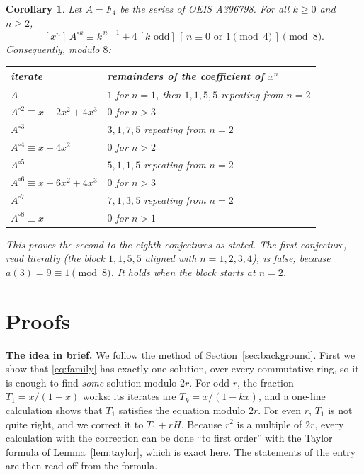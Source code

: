 \documentclass[11pt,a4paper]{article}
\newtheorem{corollary}[theorem]{Corollary}
\theoremstyle{definition}
\theoremstyle{remark}
\newcommand{\coeff}[2]{[x^{#1}]\,#2}
\newcommand{\para}[1]{\par\medskip\noindent\textbf{#1}\enspace}
\begin{document}
\begin{corollary}\label{cor:app}
Let $A=F_4$ be the series of OEIS A396798. For all $k\ge0$ and $n\ge2$,
\[
\coeff{n}{A^{\circ k}}\equiv k^{\,n-1}+4\,[k\text{ odd}]\,[\,n\equiv0\text{ or }1\!\!\pmod4\,]\pmod8 .
\]
Consequently, modulo $8$:
\begin{center}\small\upshape\renewcommand{\arraystretch}{1.15}
\begin{tabular}{ll}
\toprule
iterate & remainders of the coefficient of $x^n$\\
\midrule
$A$ & $1$ for $n=1$, then $1,1,5,5$ repeating from $n=2$\\
$A^{\circ2}\equiv x+2x^2+4x^3$ & $0$ for $n>3$\\
$A^{\circ3}$ & $3,1,7,5$ repeating from $n=2$\\
$A^{\circ4}\equiv x+4x^2$ & $0$ for $n>2$\\
$A^{\circ5}$ & $5,1,1,5$ repeating from $n=2$\\
$A^{\circ6}\equiv x+6x^2+4x^3$ & $0$ for $n>3$\\
$A^{\circ7}$ & $7,1,3,5$ repeating from $n=2$\\
$A^{\circ8}\equiv x$ & $0$ for $n>1$\\
\bottomrule
\end{tabular}
\end{center}
This proves the second to the eighth conjectures as stated. The first conjecture, read literally (the block
$1,1,5,5$ aligned with $n=1,2,3,4$), is false, because $a(3)=9\equiv1\pmod8$. It holds when the block starts at $n=2$.
\end{corollary}

\section{Proofs}\label{sec:proofs}

\para{The idea in brief.} We follow the method of Section~\ref{sec:background}. First we show that
\eqref{eq:family} has exactly one solution, over every commutative ring, so it is enough to find \emph{some} solution
modulo $2r$. For odd $r$, the fraction $T_1=x/(1-x)$ works: its iterates are $T_k=x/(1-kx)$, and a one-line
calculation shows that $T_1$ satisfies the equation modulo $2r$. For even $r$, $T_1$ is not quite right, and we
correct it to $T_1+rH$. Because $r^2$ is a multiple of $2r$, every calculation with the correction can be done
``to first order'' with the Taylor formula of Lemma~\ref{lem:taylor}, which is exact here. The statements of the entry
are then read off from the formula.
\end{document}
